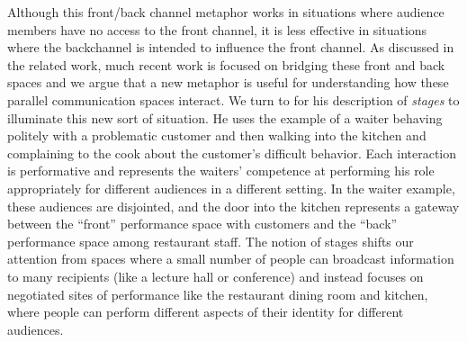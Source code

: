 
Although this front/back channel metaphor works in situations where audience members have no access to the front channel, it is less effective in situations where the backchannel is intended to influence the front channel. As discussed in the related work, much recent work is focused on bridging these front and back spaces and we argue that a new metaphor is useful for understanding how these parallel communication spaces interact. We turn to \citet{goffman_presentation_1959} for his description of \emph{stages} to illuminate this new sort of situation. He uses the example of a waiter behaving politely with a problematic customer and then walking into the kitchen and complaining to the cook about the customer's difficult behavior. Each interaction is performative and represents the waiters' competence at performing his role appropriately for different audiences in a different setting. In the waiter example, these audiences are disjointed, and the door into the kitchen represents a gateway between the ``front'' performance space with customers and the ``back'' performance space among restaurant staff. The notion of stages shifts our attention from spaces where a small number of people can broadcast information to many recipients (like a lecture hall or conference) and instead focuses on negotiated sites of performance like the restaurant dining room and kitchen, where people can perform different aspects of their identity for different audiences.



